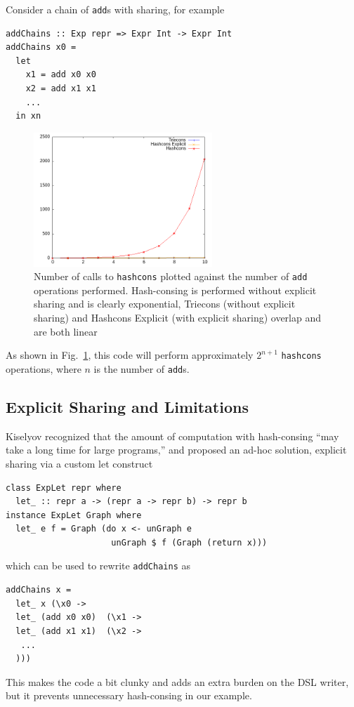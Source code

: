 \documentclass[runningheads]{llncs}
\begin{document}
Consider a chain of \texttt{add}s  with sharing, for example
\begin{verbatim}
addChains :: Exp repr => Expr Int -> Expr Int
addChains x0 = 
  let
    x1 = add x0 x0
    x2 = add x1 x1
    ...
  in xn
\end{verbatim}

\vspace{-1cm}
\begin{figure}
  \centering
  \includegraphics[width=0.6\textwidth]{figs/hashconscmp.png}
  \caption{Number of calls to \texttt{hashcons} plotted against the
    number of \texttt{add} operations performed.
    Hash-consing is performed without explicit sharing and is clearly exponential,
    Triecons (without explicit sharing) and Hashcons Explicit (with explicit
    sharing) overlap and are both linear
  } \label{fig:hashcons}
\end{figure}
As shown in Fig.~\ref{fig:hashcons}, this code will perform approximately
$2^{n+1}$ \texttt{hashcons} operations, where $n$ is the number of \texttt{add}s.

\subsection{Explicit Sharing and Limitations} \label{limitexplicit}

Kiselyov \cite{kiselyov:sharing} recognized that the amount of computation with
hash-consing ``may take a long time for large programs,'' and proposed an ad-hoc
solution, explicit sharing via a custom let construct
\begin{verbatim}
class ExpLet repr where
  let_ :: repr a -> (repr a -> repr b) -> repr b
instance ExpLet Graph where
  let_ e f = Graph (do x <- unGraph e
                     unGraph $ f (Graph (return x)))
\end{verbatim}
which can be used to rewrite \texttt{addChains} as
\begin{verbatim}
addChains x =
  let_ x (\x0 ->
  let_ (add x0 x0)  (\x1 ->
  let_ (add x1 x1)  (\x2 ->
   ...
  )))
\end{verbatim}
This makes the code a bit clunky and adds an extra burden on the DSL writer, but
it prevents unnecessary hash-consing in our example.
\end{document}

